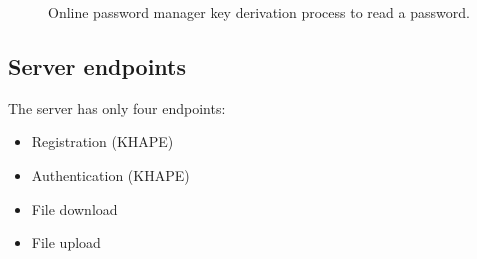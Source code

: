 \documentclass[../report.tex]{subfiles}
\begin{document}
\begin{figure}[h]
 \centering
 \setlength{\fboxsep}{10pt}
 \setlength{\fboxrule}{1pt}
 \caption{Online password manager key derivation process to read a password.}
 \label{fig:Online_password_manager}
\end{figure}


\subsection{Server endpoints}
The server has only four endpoints:
\begin{itemize}
 \item Registration (KHAPE)
 \item Authentication (KHAPE)
 \item File download
 \item File upload
\end{itemize}
\end{document}
